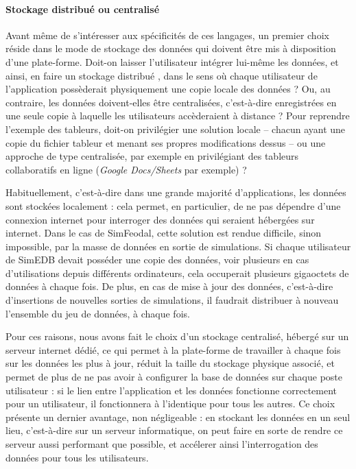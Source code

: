 			\paragraph*{Stockage distribué ou centralisé}\label{par:stockage-centralise}
			Avant même de s'intéresser aux spécificités de ces langages, un premier choix réside dans le mode de stockage des données qui doivent être mis à disposition d'une plate-forme.
			Doit-on laisser l'utilisateur intégrer lui-même les données, et ainsi, en faire un stockage \og distribué \fg{}, dans le sens où chaque utilisateur de l'application possèderait physiquement une copie locale des données ?
			Ou, au contraire, les données doivent-elles être centralisées, c'est-à-dire enregistrées en une seule copie à laquelle les utilisateurs accèderaient à distance ?
			Pour reprendre l'exemple des tableurs, doit-on privilégier une solution locale -- chacun ayant une copie du fichier tableur et menant ses propres modifications dessus -- ou une approche de type centralisée, par exemple en privilégiant des tableurs collaboratifs en ligne (\textit{Google Docs/Sheets} par exemple) ?

			Habituellement, c'est-à-dire dans une grande majorité d'applications, les données sont stockées localement : cela permet, en particulier, de ne pas dépendre d'une connexion internet pour interroger des données qui seraient hébergées sur internet.
			Dans le cas de SimFeodal, cette solution est rendue difficile, sinon impossible, par la masse de données en sortie de simulations.
			Si chaque utilisateur de SimEDB devait posséder une copie des données, voir plusieurs en cas d'utilisations depuis différents ordinateurs, cela occuperait plusieurs gigaoctets de données à chaque fois.
			De plus, en cas de mise à jour des données, c'est-à-dire d'insertions de nouvelles sorties de simulations, il faudrait distribuer à nouveau l'ensemble du jeu de données, à chaque fois.

			Pour ces raisons, nous avons fait le choix d'un stockage centralisé, hébergé sur un serveur internet dédié, ce qui permet à la plate-forme de travailler à chaque fois sur les données les plus à jour, réduit la taille du stockage physique associé, et permet de plus de ne pas avoir à configurer la base de données sur chaque poste utilisateur : si le lien entre l'application et les données fonctionne correctement pour un utilisateur, il fonctionnera à l'identique pour tous les autres.
			Ce choix présente un dernier avantage, non négligeable : en stockant les données en un seul lieu, c'est-à-dire sur un serveur informatique, on peut faire en sorte de rendre ce serveur aussi performant que possible, et accélerer ainsi l'interrogation des données pour tous les utilisateurs.

